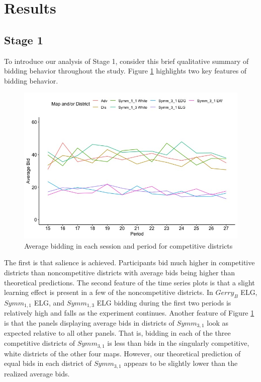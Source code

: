 \documentclass[AER]{AEA}
\begin{document}

\section{Results}
\label{section:results}

\subsection{Stage 1}
\label{subsection:Stage_1}

To introduce our analysis of Stage 1, consider this brief qualitative summary of bidding behavior throughout the study. Figure \ref{fig:full_bidding_time_series} highlights two key features of bidding behavior. 
\begin{figure}[h]
\centering
\includegraphics[scale=0.5]{full_bidding_time_series}
\caption{Average bidding in each session and period for competitive districts}
\label{fig:full_bidding_time_series}
\end{figure}
The first is that salience is achieved. Participants bid much higher in competitive districts than noncompetitive districts with average bids being higher than theoretical predictions. The second feature of the time series plots is that a slight learning effect is present in a few of the noncompetitive districts. In $Gerry_B$ ELG, $Symm_{1,1}$ ELG, and $Symm_{1,3}$ ELG bidding during the first two periods is relatively high and falls as the experiment continues. Another feature of Figure \ref{fig:full_bidding_time_series} is that the panels displaying average bids in districts of $Symm_{3,1}$ look as expected relative to all other panels. That is, bidding in each of the three competitive districts of $Symm_{3,1}$ is less than bids in the singularly competitive, white districts of the other four maps. However, our theoretical prediction of equal bids in each district of $Symm_{3,1}$ appears to be slightly lower than the realized average bids.
\end{document}
